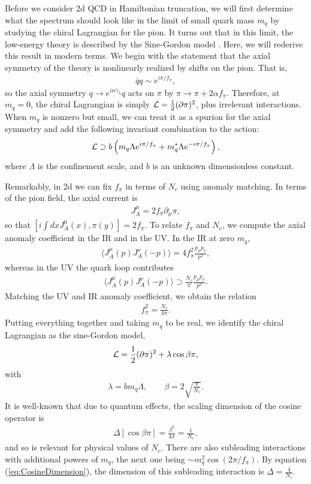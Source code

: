 \documentclass[12pt]{article}
\def\>{\rangle}
\def\<{\langle}
\newcommand{\be}{\begin{eqnarray}}
\newcommand{\ee}{\end{eqnarray}}
\newcommand{\CL}{{\cal L}}
\begin{document}
Before we consider 2d QCD in Hamiltonian truncation, we will first determine what the spectrum should look like in the limit of small quark mass $m_q$ by studying the chiral Lagrangian for the pion.  It turns out that in this limit, the low-energy theory is described by the Sine-Gordon model \cite{steinhardt1980}.  Here, we will rederive this result in modern terms.  We begin with the statement that the axial symmetry of the theory is nonlinearly realized by shifts on the pion.  That is,
 \be
 \bar{q} q \sim e^{i \pi/f_\pi},
 \ee
 so the axial symmetry $q \rightarrow e^{i \alpha \gamma_5} q$ acts on $\pi$ by $\pi \rightarrow \pi+2\alpha f_\pi$.  Therefore, at $m_q=0$, the chiral Lagrangian is simply $\CL = \frac{1}{2} (\partial \pi)^2$, plus irrelevant interactions.  When $m_q$ is nonzero but small, we can treat it as a spurion for the axial symmetry and add the following invariant combination to the action:
 \be
 \CL \supset b \left( m_q \Lambda e^{ i \pi /f_\pi}+ m_q^* \Lambda e^{- i \pi /f_\pi} \right) , 
 \ee
 where $\Lambda$ is the confinement scale, and $b$ is an unknown dimensionless constant.
 
 Remarkably, in 2d we can fix $f_\pi$ in terms of $N_c$ using anomaly matching.  In terms of the pion field, the axial current is
 \be
 J_A^\mu =2 f_\pi \partial_\mu \pi,
 \ee
 so that $[ i \int d x J_A^0(x) , \pi(y)] = 2f_\pi$. To relate $f_\pi$ and $N_c$, we compute the axial anomaly coefficient in the IR and in the UV.  In the IR at zero $m_q$,
 \be
 \< J_A^\mu(p) J_A^\nu(-p)\> =4 f_\pi^2 \frac{p_\mu p_\nu}{p^2},
 \ee
 whereas in the UV the quark loop contributes
 \be
 \<J_A^\mu(p) J_A^\nu(-p)\> \supset \frac{N_c}{\pi} \frac{p_\mu p_\nu}{p^2}. 
 \ee
 Matching the UV and IR anomaly coefficient, we obtain the relation
 \be
 f_\pi^2 = \frac{N_c}{4 \pi}.
 \ee
Putting everything together and taking $m_q$ to be real, we identify the chiral Lagrangian as the sine-Gordon model,
\be\label{eq:SG-Lagrangian}
\CL = \frac{1}{2} (\partial \pi)^2 + \lambda \cos \beta \pi,
\ee
with
\be
 \lambda = b m_q \Lambda, \qquad \beta = 2\sqrt{\frac{\pi}{N_c}}.
 \ee
 It is well-known that due to quantum effects, the scaling dimension of the cosine operator is
 \be
 \Delta[ \cos \beta \pi ] = \frac{\beta^2}{4\pi} = \frac{1}{N_c},
 \label{eq:CosineDimension}
 \ee
 and so is relevant for physical values of $N_c$.  There are also subleading interactions with additional powers of $m_q$, the next one being $\sim m_q^2 \cos(2 \pi/f_\pi)$.  By equation (\ref{eq:CosineDimension}), the dimension of this subleading interaction is $\Delta = \frac{4}{N_c}$.
 
\end{document}
